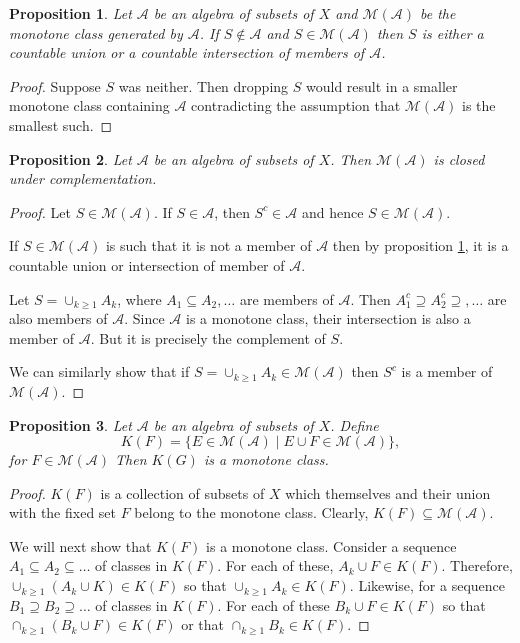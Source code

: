 \documentclass{article}
\theoremstyle{plain}
\numberwithin{thm}{section}
\theoremstyle{plain}
\newtheorem{prop}{Proposition}
\numberwithin{prop}{section}
\theoremstyle{definition}
\numberwithin{defn}{section}
\theoremstyle{remark}
\theoremstyle{plain}
\numberwithin{cor}{section}
\numberwithin{equation}{section}
\begin{document}
\begin{prop}\label{s6p4}
Let $\mathcal{A}$ be an algebra of subsets of $X$ and $\mathcal{M}(\mathcal{A})$
be the monotone class generated by $\mathcal{A}$. If $S \notin \mathcal{A}$ and
$S \in \mathcal{M}(\mathcal{A})$ then $S$ is either a countable union or a 
countable intersection of members of $\mathcal{A}$.
\end{prop}
\begin{proof}
Suppose $S$ was neither. Then dropping $S$ would result in a smaller monotone 
class containing $\mathcal{A}$ contradicting the assumption that 
$\mathcal{M}(\mathcal{A})$ is the smallest such.
\end{proof}

\begin{prop}\label{s6p5}
Let $\mathcal{A}$ be an algebra of subsets of $X$. Then $\mathcal{M}(\mathcal{A})$
is closed under complementation.
\end{prop}
\begin{proof}
Let $S \in \mathcal{M}(\mathcal{A})$. If $S \in \mathcal{A}$, then $S^c \in
\mathcal{A}$ and hence $S \in \mathcal{M}(\mathcal{A})$.

If $S \in \mathcal{M}(\mathcal{A})$ is such that it is not a member of 
$\mathcal{A}$ then by proposition \ref{s6p4}, it is a countable union or 
intersection of member of $\mathcal{A}$.

Let $S = \cup_{k \ge 1}A_k$, where $A_1 \subseteq A_2, \ldots$ are members of
$\mathcal{A}$. Then $A_1^c \supseteq A_2^c \supseteq, \ldots$ are also members of
$\mathcal{A}$. Since $\mathcal{A}$ is a monotone class, their intersection is also
a member of $\mathcal{A}$. But it is precisely the complement of $S$.

We can similarly show that if $S = \cup_{k \ge 1}A_k \in \mathcal{M}(\mathcal{A})$
then $S^c$ is a member of $\mathcal{M}(\mathcal{A})$.
\end{proof}

\begin{prop}\label{s6p6}
Let $\mathcal{A}$ be an algebra of subsets of $X$. Define 
\[
K(F) = \{E \in \mathcal{M}(\mathcal{A})\;|\; E \cup F \in
\mathcal{M}(\mathcal{A})\},
\]
for $F \in \mathcal{M}(\mathcal{A})$
Then $K(G)$ is a monotone class.
\end{prop}
\begin{proof}
$K(F)$ is a collection of subsets of $X$ which themselves and their union
with the fixed set $F$ belong to the monotone class. Clearly, $K(F) \subseteq
\mathcal{M}(\mathcal{A})$.

We will next show that $K(F)$ is a monotone class. Consider a sequence $A_1
\subseteq A_2 \subseteq \ldots$ of classes in $K(F)$. For each of these, $A_k
\cup F \in K(F)$. Therefore, $\cup_{k \ge 1}(A_k \cup K) \in K(F)$ so that
$\cup_{k \ge 1}A_k \in K(F)$. Likewise, for a sequence $B_1 \supseteq B_2
\supseteq \ldots$ of classes in $K(F)$. For each of these $B_k \cup F \in K(F)$
so that $\cap_{k \ge 1}(B_k \cup F) \in K(F)$ or that $\cap_{k \ge 1}B_k \in 
K(F)$.
\end{proof}
\end{document}
